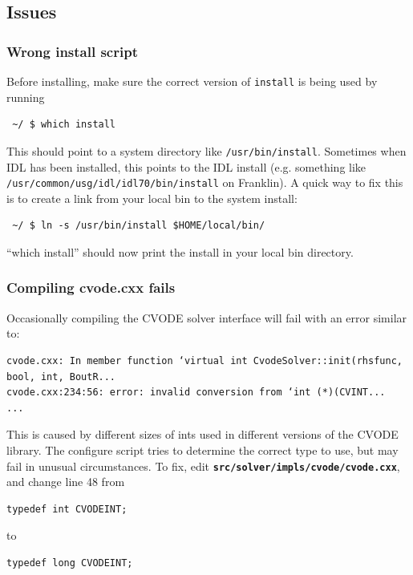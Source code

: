 \documentclass[12pt]{article}
\newcommand{\file}[1]{\texttt{\bf #1}}
\begin{document}
\subsection{Issues}
%


\subsubsection{Wrong install script}
%
Before installing, make sure the correct version of \texttt{install} is being
used by running
%
\begin{verbatim}
 ~/ $ which install
\end{verbatim}
%
This should point to a system directory like \texttt{/usr/bin/install}.
Sometimes when IDL has been installed, this points to the IDL install (e.g.
something like \texttt{/usr/common/usg/idl/idl70/bin/install} on Franklin). A
quick way to fix this is to create a link from your local bin to the system
install:
%
\begin{verbatim}
 ~/ $ ln -s /usr/bin/install $HOME/local/bin/
\end{verbatim}
%
``which install'' should now print the install in your local bin directory.


\subsubsection{Compiling cvode.cxx fails}
%
%
Occasionally compiling the CVODE solver interface will fail with an error
similar to:
%
\begin{verbatim}
cvode.cxx: In member function ‘virtual int CvodeSolver::init(rhsfunc, bool, int, BoutR...
cvode.cxx:234:56: error: invalid conversion from ‘int (*)(CVINT...
...
\end{verbatim}
%
This is caused by different sizes of ints used in different versions of the
CVODE library.  The configure script tries to determine the correct type to
use, but may fail in unusual circumstances.  To fix, edit
\file{src/solver/impls/cvode/cvode.cxx}, and change line 48 from
%
\begin{lstlisting}[numbers=none]
typedef int CVODEINT;
\end{lstlisting}
%
to
%
\begin{lstlisting}[numbers=none]
typedef long CVODEINT;
\end{lstlisting}
%
\end{document}
